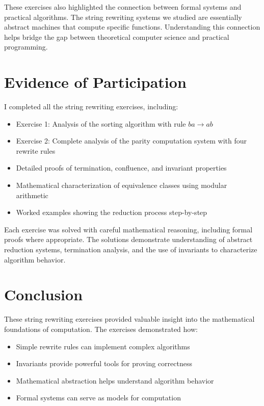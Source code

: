 \documentclass{article}
\theoremstyle{plain}
\theoremstyle{definition}
\theoremstyle{remark}
\begin{document}
These exercises also highlighted the connection between formal systems and practical algorithms. The string rewriting systems we studied are essentially abstract machines that compute specific functions. Understanding this connection helps bridge the gap between theoretical computer science and practical programming.

\section{Evidence of Participation}

I completed all the string rewriting exercises, including:

\begin{itemize}
\item Exercise 1: Analysis of the sorting algorithm with rule $ba \to ab$
\item Exercise 2: Complete analysis of the parity computation system with four rewrite rules
\item Detailed proofs of termination, confluence, and invariant properties
\item Mathematical characterization of equivalence classes using modular arithmetic
\item Worked examples showing the reduction process step-by-step
\end{itemize}

Each exercise was solved with careful mathematical reasoning, including formal proofs where appropriate. The solutions demonstrate understanding of abstract reduction systems, termination analysis, and the use of invariants to characterize algorithm behavior.

\section{Conclusion}\label{conclusion}

These string rewriting exercises provided valuable insight into the mathematical foundations of computation. The exercises demonstrated how:

\begin{itemize}
\item Simple rewrite rules can implement complex algorithms
\item Invariants provide powerful tools for proving correctness
\item Mathematical abstraction helps understand algorithm behavior
\item Formal systems can serve as models for computation
\end{itemize}
\end{document}
